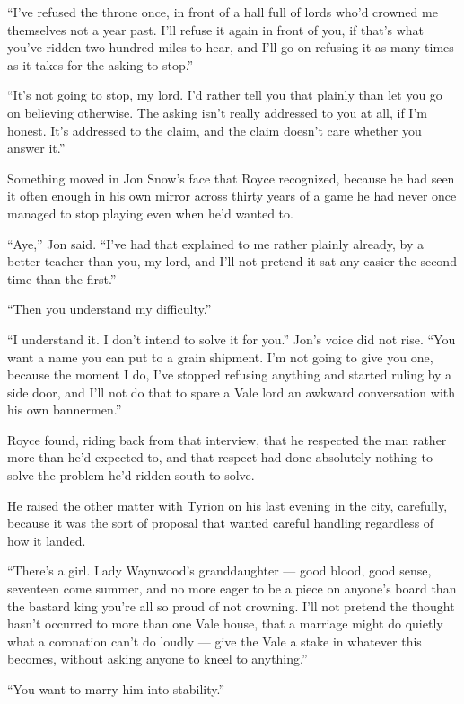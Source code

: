 “I’ve refused the throne once, in front of a hall full of lords who’d crowned me themselves not a year past. I’ll refuse it again in front of you, if that’s what you’ve ridden two hundred miles to hear, and I’ll go on refusing it as many times as it takes for the asking to stop.”

“It’s not going to stop, my lord. I’d rather tell you that plainly than let you go on believing otherwise. The asking isn’t really addressed to you at all, if I’m honest. It’s addressed to the claim, and the claim doesn’t care whether you answer it.”

Something moved in Jon Snow’s face that Royce recognized, because he had seen it often enough in his own mirror across thirty years of a game he had never once managed to stop playing even when he’d wanted to.

“Aye,” Jon said. “I’ve had that explained to me rather plainly already, by a better teacher than you, my lord, and I’ll not pretend it sat any easier the second time than the first.”

“Then you understand my difficulty.”

“I understand it. I don’t intend to solve it for you.” Jon’s voice did not rise. “You want a name you can put to a grain shipment. I’m not going to give you one, because the moment I do, I’ve stopped refusing anything and started ruling by a side door, and I’ll not do that to spare a Vale lord an awkward conversation with his own bannermen.”

Royce found, riding back from that interview, that he respected the man rather more than he’d expected to, and that respect had done absolutely nothing to solve the problem he’d ridden south to solve.

\sceneBreak

He raised the other matter with Tyrion on his last evening in the city, carefully, because it was the sort of proposal that wanted careful handling regardless of how it landed.

“There’s a girl. Lady Waynwood’s granddaughter — good blood, good sense, seventeen come summer, and no more eager to be a piece on anyone’s board than the bastard king you’re all so proud of not crowning. I’ll not pretend the thought hasn’t occurred to more than one Vale house, that a marriage might do quietly what a coronation can’t do loudly — give the Vale a stake in whatever this becomes, without asking anyone to kneel to anything.”

“You want to marry him into stability.”

